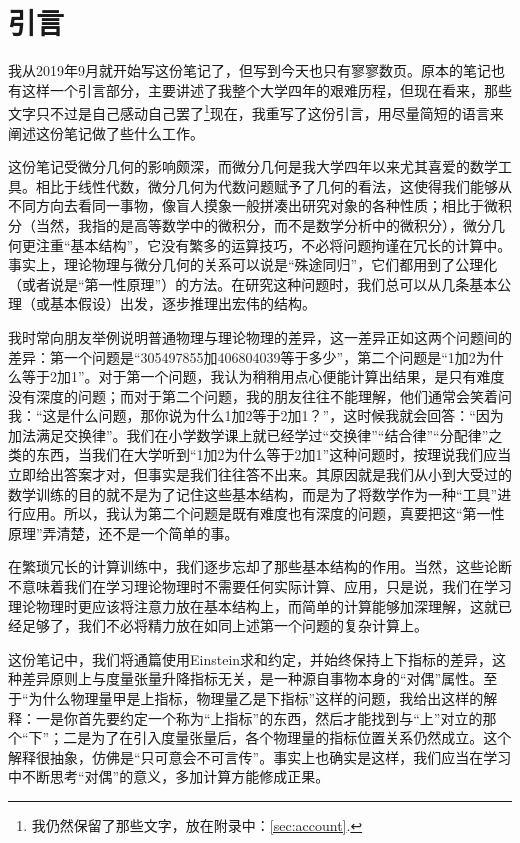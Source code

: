 \part{引言}
		
		我从2019年9月就开始写这份笔记了，但写到今天也只有寥寥数页。原本的笔记也有这样一个引言部分，主要讲述了我整个大学四年的艰难历程，但现在看来，那些文字只不过是自己感动自己罢了\footnote{我仍然保留了那些文字，放在附录中：\ref{sec:account}.}现在，我重写了这份引言，用尽量简短的语言来阐述这份笔记做了些什么工作。
	
		这份笔记受微分几何的影响颇深，而微分几何是我大学四年以来尤其喜爱的数学工具。相比于线性代数，微分几何为代数问题赋予了几何的看法，这使得我们能够从不同方向去看同一事物，像盲人摸象一般拼凑出研究对象的各种性质；相比于微积分（当然，我指的是高等数学中的微积分，而不是数学分析中的微积分），微分几何更注重“基本结构”，它没有繁多的运算技巧，不必将问题拘谨在冗长的计算中。事实上，理论物理与微分几何的关系可以说是“殊途同归”，它们都用到了公理化（或者说是“第一性原理”）的方法。在研究这种问题时，我们总可以从几条基本公理（或基本假设）出发，逐步推理出宏伟的结构。
		
		我时常向朋友举例说明普通物理与理论物理的差异，这一差异正如这两个问题间的差异：第一个问题是“305497855加406804039等于多少”，第二个问题是“1加2为什么等于2加1”。对于第一个问题，我认为稍稍用点心便能计算出结果，是只有难度没有深度的问题；而对于第二个问题，我的朋友往往不能理解，他们通常会笑着问我：“这是什么问题，那你说为什么1加2等于2加1？”，这时候我就会回答：“因为加法满足交换律”。我们在小学数学课上就已经学过“交换律”“结合律”“分配律”之类的东西，当我们在大学听到“1加2为什么等于2加1”这种问题时，按理说我们应当立即给出答案才对，但事实是我们往往答不出来。其原因就是我们从小到大受过的数学训练的目的就不是为了记住这些基本结构，而是为了将数学作为一种“工具”进行应用。所以，我认为第二个问题是既有难度也有深度的问题，真要把这“第一性原理”弄清楚，还不是一个简单的事。
		
		在繁琐冗长的计算训练中，我们逐步忘却了那些基本结构的作用。当然，这些论断不意味着我们在学习理论物理时不需要任何实际计算、应用，只是说，我们在学习理论物理时更应该将注意力放在基本结构上，而简单的计算能够加深理解，这就已经足够了，我们不必将精力放在如同上述第一个问题的复杂计算上。

		这份笔记中，我们将通篇使用Einstein求和约定，并始终保持上下指标的差异，这种差异原则上与度量张量升降指标无关，是一种源自事物本身的“对偶”属性。至于“为什么物理量甲是上指标，物理量乙是下指标”这样的问题，我给出这样的解释：一是你首先要约定一个称为“上指标”的东西，然后才能找到与“上”对立的那个“下”；二是为了在引入度量张量后，各个物理量的指标位置关系仍然成立。这个解释很抽象，仿佛是“只可意会不可言传”。事实上也确实是这样，我们应当在学习中不断思考“对偶”的意义，多加计算方能修成正果。
	
	
		\newpage